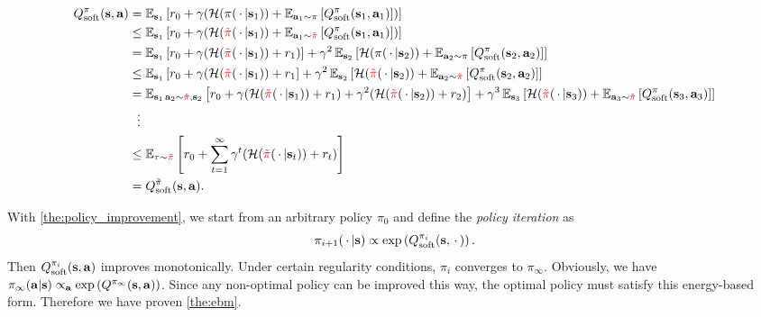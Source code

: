 \begin{align}
\Qpisoft(\state,\action) &= \E{\state_1}{\rz + \discount(\entropy(\pi(\sdots | \state_1)) + \E{\action_1 \sim \pi}{\Qpisoft(\state_1,\action_1)})} \notag\\
&\leq \E{\state_1}{\rz + \discount(\entropy(\pitildered(\sdots | \state_1)) + \E{\action_1 \sim \pitildered}{\Qpisoft(\state_1,\action_1)})} \notag\\
&= \E{\state_1}{\reward_0 + \discount(\entropy(\pitildered(\sdots | \state_1)) + \reward_1)}  + \discount^2\E{\state_2}{\entropy(\pi(\sdots | \state_2)) + \E{\action_2 \sim \pi}{\Qpisoft(\state_2,\action_2)}} \notag\\
&\leq \E{\state_1}{\rz + \discount(\entropy(\pitildered(\sdots | \state_1)) +\reward_1} + \discount^2\E{\state_2}{\entropy(\pitildered(\sdots | \state_2)) + \E{\action_2 \sim \pitildered}{\Qpisoft(\state_2,\action_2)}} \notag\\
&= \E{\state_1\, \action_2\sim\pitildered, \state_2}{\rz + \discount(\entropy(\pitildered(\sdots | \state_1)) + \reward_1) + \discount^2(\entropy(\pitildered(\sdots | \state_2)) + \reward_2)} + \discount^3\E{\state_3}{\entropy(\pitildered(\sdots | \state_3)) + \E{\action_3 \sim \pitildered}{\Qpisoft(\state_3,\action_3)}} \notag\\
&\ \ \vdots \notag\\
&\leq \E{\tau \sim \pitildered}{\rz + \sum_{t=1}^{\infty}\discount^t(\entropy(\pitildered(\sdots | \st)) + \rt)} \notag\\
&= \Qpitildesoft(\state,\action).
\end{align}

With \autoref{the:policy_improvement}, we start from an arbitrary policy $\pi_0$ and define the \textit{policy iteration} as
\begin{equation}
\pi_{i+1}(\,\cdot\, |\mathbf{s}) \propto \exp\left(Q^{\pi_i}_{\mathrm{soft}}(\mathbf{s},\,\cdot\, )\right).
\end{equation}
Then $Q^{\pi_i}_{\text{soft}}(\mathbf{s},\mathbf{a})$ improves monotonically. Under certain regularity conditions, $\pi_i$ converges to $\pi_{\infty}$. Obviously, we have $\pi_{\infty}(\mathbf{a}|\mathbf{s}) \propto_{\mathbf{a}} \exp\left(Q^{\pi_{\infty}}(\mathbf{s},\mathbf{a})\right)$. Since any non-optimal policy can be improved this way, the optimal policy must satisfy this energy-based form. Therefore we have proven \autoref{the:ebm}.


